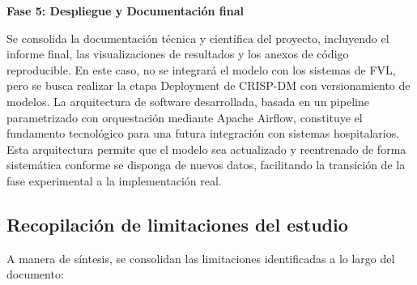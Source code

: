 \textbf{Fase 5: Despliegue y Documentación final}

Se consolida la documentación técnica y científica del proyecto, incluyendo el informe final, las visualizaciones de resultados y los anexos de código reproducible. En este caso, no se integrará el modelo con los sistemas de FVL, pero se busca realizar la etapa Deployment de CRISP-DM con versionamiento de modelos. La arquitectura de software desarrollada, basada en un pipeline parametrizado con orquestación mediante Apache Airflow, constituye el fundamento tecnológico para una futura integración con sistemas hospitalarios. Esta arquitectura permite que el modelo sea actualizado y reentrenado de forma sistemática conforme se disponga de nuevos datos, facilitando la transición de la fase experimental a la implementación real.

\subsection{Recopilación de limitaciones del estudio}

A manera de síntesis, se consolidan las limitaciones identificadas a lo largo del documento:


